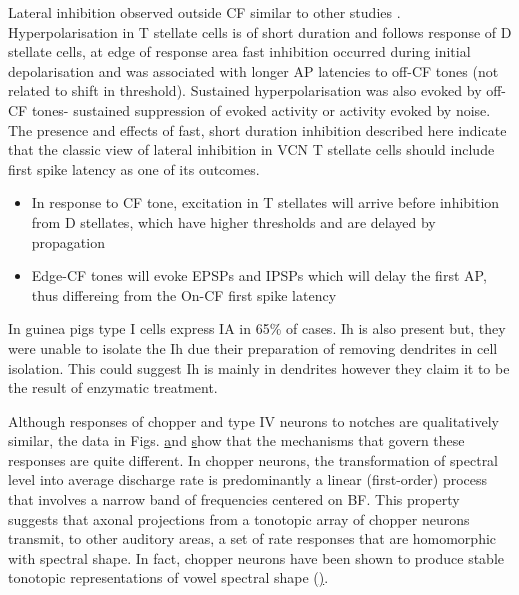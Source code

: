 \documentclass[10pt,a4paper]{article}
\begin{document}
Lateral inhibition observed outside CF similar to other studies
\citep{FerragamoGoldingEtAl:1998a,FujinoOertel:2001,RhodeGreenberg:1994a}. Hyperpolarisation
in T stellate cells is of short duration and follows response of D stellate
cells, at edge of response area fast inhibition occurred during initial
depolarisation and was associated with longer AP latencies to off-CF tones (not
related to shift in threshold).  Sustained hyperpolarisation was also evoked by
off-CF tones- sustained suppression of evoked activity or activity evoked by
noise.  The presence and effects of fast, short duration inhibition described
here indicate that the classic view of lateral inhibition in VCN T stellate
cells should include first spike latency as one of its outcomes.


\begin{itemize}
\item In response to CF tone, excitation in T stellates will arrive before
  inhibition from D stellates, which have higher thresholds and are delayed by
  propagation
\item Edge-CF tones will evoke EPSPs and IPSPs which will delay the first AP,
  thus differeing from the On-CF first spike latency
\end{itemize}
In guinea pigs \citep{RothmanManis:2003a} type I cells express IA in 65\% of
cases. Ih is also present but, they were unable to isolate the Ih due their
preparation of removing dendrites in cell isolation. This could suggest Ih is
mainly in dendrites however they claim it to be the result of enzymatic
treatment.

\citep{RhodeGreenberg:1994a}

\citep{YuYoung:2000}

Although responses of chopper and type IV neurons to notches are qualitatively
similar, the data in Figs.
\href{www.pnas.org/cgi/content/full/97/22/11780#F5}
and
\href{www.pnas.org/cgi/content/full/97/22/11780#F6}
show that the mechanisms that govern these responses are quite different. In
chopper neurons, the transformation of spectral level into average discharge
rate is predominantly a linear (first-order) process that involves a narrow band
of frequencies centered on BF. This property suggests that axonal projections
from a tonotopic array of chopper neurons transmit, to other auditory areas, a
set of rate responses that are homomorphic with spectral shape. In fact, chopper
neurons have been shown to produce stable tonotopic representations of vowel
spectral shape
(\href{www.pnas.org/cgi/content/full/97/22/11780#B8}).
\end{document}
